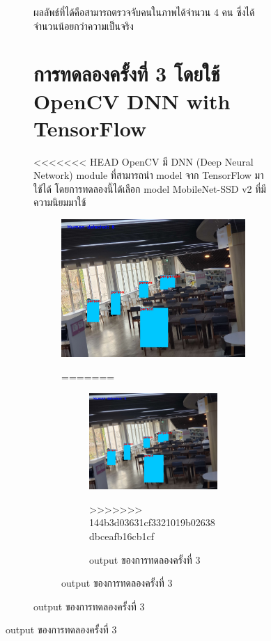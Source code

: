 \begin{figure}[h]
\begin{figure}[h]
ผลลัพธ์ที่ได้คือสามารถตรวจจับคนในภาพได้จำนวน 4 คน ซึ่งได้จำนวนน้อยกว่าความเป็นจริง

\section{การทดลองครั้งที่ 3 โดยใช้ OpenCV DNN with TensorFlow}
<<<<<<< HEAD
\hspace{10mm} OpenCV มี DNN (Deep Neural Network) module ที่สามารถนำ model จาก TensorFlow มาใช้ได้ โดยการทดลองนี้ได้เลือก model MobileNet-SSD v2 ที่มีความนิยมมาใช้

\begin{figure}[h]
    \centering
    \includegraphics[scale=0.25]{images/dnn_output.jpg}
    \caption[output]{output ของการทดลองครั้งที่ 3}
    \label{fig:output3}
=======
\begin{figure}[ht]
\centering
\includegraphics[scale=0.25]{images/dnn_output.jpg}
\caption[output3]{output ของการทดลองครั้งที่ 3}
\label{fig:output3}
>>>>>>> 144b3d03631cf3321019b02638dbceafb16cb1cf
\end{figure}


\end{figure}
\end{figure}
\end{figure}
